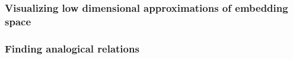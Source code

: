 \subsubsection{Visualizing low dimensional approximations of embedding space}

\subsubsection{Finding analogical relations}
